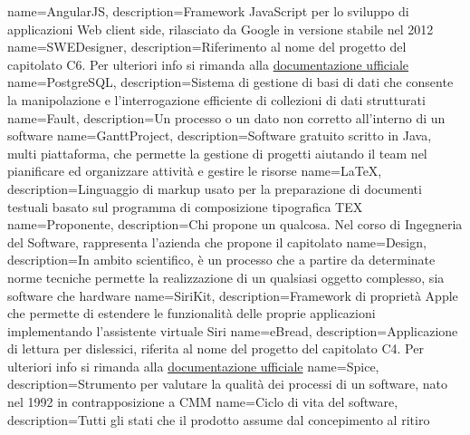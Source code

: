  {
	name=AngularJS,
	description={Framework JavaScript per lo sviluppo di applicazioni Web client side, rilasciato da Google in versione stabile nel 2012}
}
 {
	name=SWEDesigner,
	description={Riferimento al nome del progetto del capitolato C6. Per ulteriori info si rimanda alla \href{http://www.math.unipd.it/~tullio/IS-1/2016/Progetto/C6.pdf}{documentazione ufficiale}}
}
 {
	name=PostgreSQL,
	description={Sistema di gestione di basi di dati che consente la manipolazione e l'interrogazione efficiente di collezioni di dati strutturati}
}
 {
	name=Fault,
	description={Un processo o un dato non corretto all'interno di un software}
}
 {
	name=GanttProject,
	description={Software gratuito scritto in Java, multi piattaforma, che permette la gestione di progetti aiutando il team nel pianificare ed organizzare attività e gestire le risorse}
}
 {
	name=LaTeX,
	description={Linguaggio di markup usato per la preparazione di documenti testuali basato sul programma di composizione tipografica TEX}
}
 {
	name=Proponente,
	description={Chi propone un qualcosa. Nel corso di Ingegneria del Software, rappresenta l'azienda che propone il capitolato}
}
 {
	name=Design,
	description={In ambito scientifico, è un processo che a partire da determinate norme tecniche permette la realizzazione di un qualsiasi oggetto complesso, sia software che hardware}
}
 {
	name=SiriKit,
	description={Framework di proprietà Apple che permette di estendere le funzionalità delle proprie applicazioni implementando l'assistente virtuale Siri}
}
 {
	name=eBread,
	description={Applicazione di lettura per dislessici, riferita al nome del progetto del capitolato C4. Per ulteriori info si rimanda alla \href{http://www.math.unipd.it/~tullio/IS-1/2016/Progetto/C4.pdf}{documentazione ufficiale}}
}
 {
	name=Spice,
	description={Strumento per valutare la qualità dei processi di un software, nato nel 1992 in contrapposizione a CMM}
}
 {
	name=Ciclo di vita del software,
	description={Tutti gli stati che il prodotto assume dal concepimento al ritiro}
}
